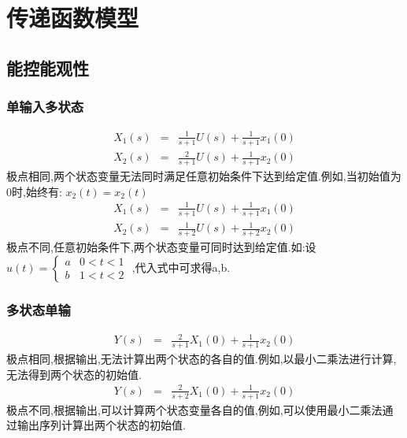 \documentclass{article}
\begin{document}
\section{传递函数模型}
\label{sec-3}
\subsection{能控能观性}
\label{sec-3-1}
\begin{frame}
\frametitle{单输入多状态}
\label{sec-3-1-1}

\begin{eqnarray*}
X_1(s) & =&\frac{1}{s+1}U(s)+\frac{1}{s+1}x_1(0) \\
X_2(s) &=& \frac{2}{s+1}U(s)+\frac{1}{s+1}x_2(0)
\end{eqnarray*}
极点相同,两个状态变量无法同时满足任意初始条件下达到给定值.例如,当初始值为0时,始终有: $x_2(t)=x_2(t)$
\begin{eqnarray*}
X_1(s) & =&\frac{1}{s+1}U(s)+\frac{1}{s+1}x_1(0) \\
X_2(s) &=& \frac{1}{s+2}U(s)+\frac{1}{s+2}x_2(0)
\end{eqnarray*}
极点不同,任意初始条件下,两个状态变量可同时达到给定值.如:设 $u(t)=\begin{cases}a & 0<t<1 \\ b & 1<t<2 \end{cases}$ ,代入式中可求得a,b.
\end{frame}
\begin{frame}
\frametitle{多状态单输}
\label{sec-3-1-2}

\begin{eqnarray*}
Y(s) & =&\frac{2}{s+1}X_1(0)+\frac{1}{s+1}x_2(0) 
\end{eqnarray*}
极点相同,根据输出,无法计算出两个状态的各自的值.例如,以最小二乘法进行计算,无法得到两个状态的初始值.
\begin{eqnarray*}
Y(s) & =&\frac{2}{s+2}X_1(0)+\frac{1}{s+1}x_2(0) 
\end{eqnarray*}
极点不同,根据输出,可以计算两个状态变量各自的值,例如,可以使用最小二乘法通过输出序列计算出两个状态的初始值.
\end{frame}
\end{document}
